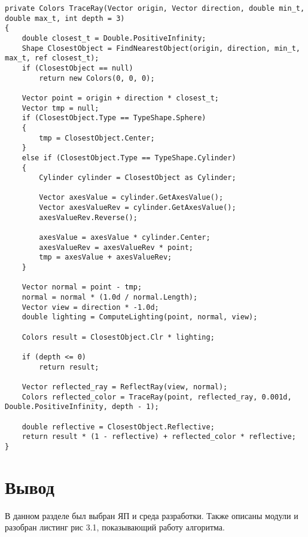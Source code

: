 \begin{lstlisting}[label=some-code,caption=Трассировка лучей.]
private Colors TraceRay(Vector origin, Vector direction, double min_t, double max_t, int depth = 3)
{
	double closest_t = Double.PositiveInfinity;
	Shape ClosestObject = FindNearestObject(origin, direction, min_t, max_t, ref closest_t);
	if (ClosestObject == null)
		return new Colors(0, 0, 0);

	Vector point = origin + direction * closest_t;
	Vector tmp = null;
	if (ClosestObject.Type == TypeShape.Sphere)
	{
		tmp = ClosestObject.Center;
	}
	else if (ClosestObject.Type == TypeShape.Cylinder)
	{
		Cylinder cylinder = ClosestObject as Cylinder;

		Vector axesValue = cylinder.GetAxesValue();   
		Vector axesValueRev = cylinder.GetAxesValue(); 		
		axesValueRev.Reverse();

		axesValue = axesValue * cylinder.Center; 
		axesValueRev = axesValueRev * point;
		tmp = axesValue + axesValueRev; 
	}

	Vector normal = point - tmp;
	normal = normal * (1.0d / normal.Length);
	Vector view = direction * -1.0d;
	double lighting = ComputeLighting(point, normal, view);

	Colors result = ClosestObject.Clr * lighting;

	if (depth <= 0)
		return result;

	Vector reflected_ray = ReflectRay(view, normal);
	Colors reflected_color = TraceRay(point, reflected_ray, 0.001d, Double.PositiveInfinity, depth - 1);

	double reflective = ClosestObject.Reflective;
	return result * (1 - reflective) + reflected_color * reflective;
}
\end{lstlisting}

\section{Вывод}

В данном разделе был выбран ЯП и среда разработки.
Также описаны модули и разобран листинг рис 3.1, показывающий работу алгоритма.